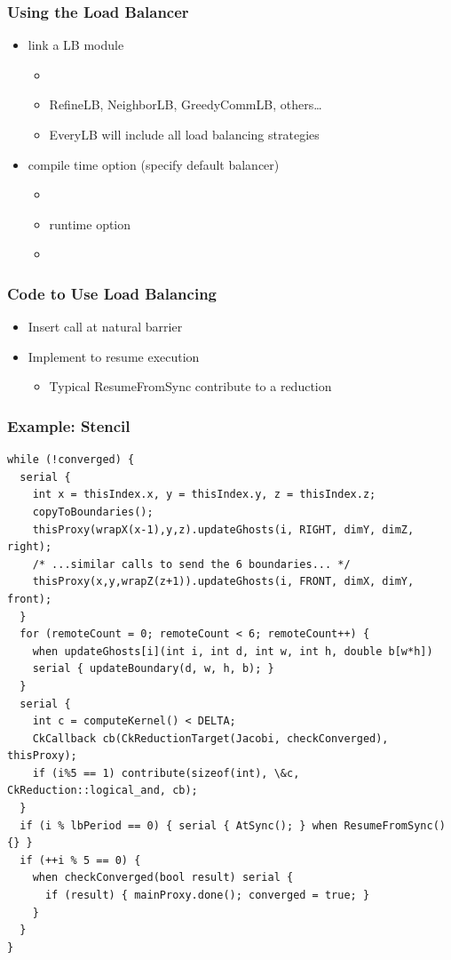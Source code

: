 \begin{frame}[fragile]
\frametitle{Using the Load Balancer}
\begin{itemize}
\item link a LB module 
\begin{itemize}
\item {}
\item RefineLB, NeighborLB, GreedyCommLB, others…
\item EveryLB will include all load balancing strategies
\end{itemize}
\item compile time option (specify default balancer)
\begin{itemize}
\item {}
\item runtime option
\item {}
\end{itemize}
\end{itemize}
\end{frame}

\begin{frame}
\frametitle{Code to Use Load Balancing}
\begin{itemize}
\item Insert  call at natural barrier
\item Implement  to resume execution
\begin{itemize}
\item Typical ResumeFromSync contribute to a reduction
\end{itemize}
\end{itemize}
\end{frame}

\begin{frame}[fragile]
\frametitle{Example: Stencil}
\begin{lstlisting}[basicstyle=\tiny]
while (!converged) {
  serial {
    int x = thisIndex.x, y = thisIndex.y, z = thisIndex.z;
    copyToBoundaries();
    thisProxy(wrapX(x-1),y,z).updateGhosts(i, RIGHT, dimY, dimZ, right);
    /* ...similar calls to send the 6 boundaries... */
    thisProxy(x,y,wrapZ(z+1)).updateGhosts(i, FRONT, dimX, dimY, front);
  }
  for (remoteCount = 0; remoteCount < 6; remoteCount++) {
    when updateGhosts[i](int i, int d, int w, int h, double b[w*h])
    serial { updateBoundary(d, w, h, b); }
  }
  serial {
    int c = computeKernel() < DELTA;
    CkCallback cb(CkReductionTarget(Jacobi, checkConverged), thisProxy);
    if (i%5 == 1) contribute(sizeof(int), \&c, CkReduction::logical_and, cb);
  }
  if (i % lbPeriod == 0) { serial { AtSync(); } when ResumeFromSync() {} }
  if (++i % 5 == 0) {
    when checkConverged(bool result) serial {
      if (result) { mainProxy.done(); converged = true; }
    }
  }
}
\end{lstlisting}
\end{frame}

